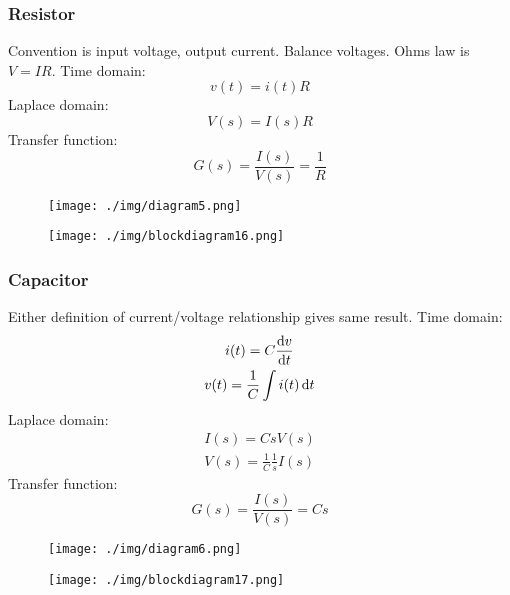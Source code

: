 \subsubsection{Resistor}
Convention is input voltage, output current. Balance voltages.
Ohms law is $V=IR$. Time domain:
\begin{equation}
  v(t) = i(t)R
\end{equation}
Laplace domain:
\begin{equation}
  V(s) = I(s)R
\end{equation}
Transfer function:
\begin{equation}
  G(s) = \frac{I(s)}{V(s)} = \frac{1}{R}
\end{equation}
\begin{figure}[H]
  \centering
  \texttt{[image: ./img/diagram5.png]}
\end{figure}
\begin{figure}[H]
  \centering
  \texttt{[image: ./img/blockdiagram16.png]}
\end{figure}
\subsubsection{Capacitor}
Either definition of current/voltage relationship gives same result. Time domain:
\begin{gather}
  i(t) = C\frac{\dif v}{\dif t}\\
  v(t) = \frac{1}{C}\int i(t) \dif t
\end{gather}
Laplace domain:
\begin{gather}
  I(s) = CsV(s)\\
  V(s) = \frac{1}{C} \frac{1}{s} I(s)
\end{gather}
Transfer function:
\begin{equation}
  G(s) = \frac{I(s)}{V(s)} = Cs
\end{equation}
\begin{figure}[H]
  \centering
  \texttt{[image: ./img/diagram6.png]}
\end{figure}
\begin{figure}[H]
  \centering
  \texttt{[image: ./img/blockdiagram17.png]}
\end{figure}
